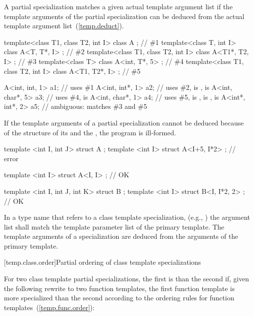 \pnum
A partial specialization matches a given actual template argument
list if the template arguments of the partial specialization can be
deduced from the actual template argument list~(\ref{temp.deduct}).
\begin{example}

\begin{codeblock}
template<class T1, class T2, int I> class A             { };    // \#1
template<class T, int I>            class A<T, T*, I>   { };    // \#2
template<class T1, class T2, int I> class A<T1*, T2, I> { };    // \#3
template<class T>                   class A<int, T*, 5> { };    // \#4
template<class T1, class T2, int I> class A<T1, T2*, I> { };    // \#5

A<int, int, 1>   a1;            // uses \#1
A<int, int*, 1>  a2;            // uses \#2,  is ,  is 
A<int, char*, 5> a3;            // uses \#4,  is 
A<int, char*, 1> a4;            // uses \#5,  is ,  is ,  is 
A<int*, int*, 2> a5;            // ambiguous: matches \#3 and \#5
\end{codeblock}
\end{example}

\pnum
If the template arguments of a partial specialization cannot be deduced
because of the structure of its 
and the ,
the program is ill-formed.
\begin{example}
\begin{codeblock}
template <int I, int J> struct A {};
template <int I> struct A<I+5, I*2> {};     // error

template <int I> struct A<I, I> {};         // OK

template <int I, int J, int K> struct B {};
template <int I> struct B<I, I*2, 2> {};    // OK
\end{codeblock}
\end{example}

\pnum
In a type name that refers to a class template specialization, (e.g.,
)
the argument list shall match the template parameter list of the primary
template.
The template arguments of a specialization are deduced from the arguments
of the primary template.

[temp.class.order]{Partial ordering of class template specializations}

\pnum
{}%
For two class template partial specializations,
the first is  than the second if, given the following
rewrite to two function templates, the first function template is more
specialized than the second according to the ordering rules for function
templates~(\ref{temp.func.order}):

